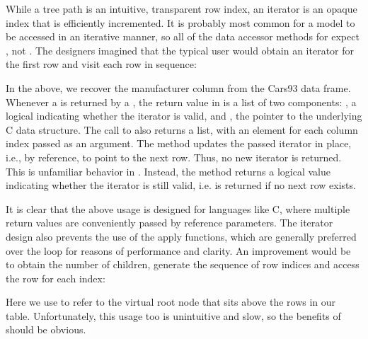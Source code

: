 While a tree path is an intuitive, transparent row index, an iterator
is an opaque index that is efficiently incremented. It is
probably most common for a model to be accessed in an iterative
manner, so all of the data accessor methods for 
expect , not . The \GTK\/
designers imagined that the typical user would obtain an iterator for
the first row and visit each row in sequence:
\begin{Schunk}
\end{Schunk}
%
In the above, we recover the manufacturer column from the Cars93 data
frame. Whenever a  is returned by a
, the return value in \R\/ is a list of two
components: , a logical indicating whether the iterator
is valid, and , the pointer to the underlying C data
structure. The call to  also returns a list,
with an element for each column index passed as an argument. The
method  updates the passed iterator in
place, i.e., by reference, to point to the next row. Thus, no new
iterator is returned. This is unfamiliar behavior in \R. Instead, the
method returns a logical value indicating whether the iterator is
still valid, i.e.  is returned if no next row exists.

It is clear that the above usage is designed for languages like C,
where multiple return values are conveniently passed by reference
parameters. The iterator design also prevents the use of the apply
functions, which are generally preferred over the  loop
for reasons of performance and clarity. An improvement would be to
obtain the number of children, generate the sequence of row indices
and access the row for each index:
\begin{Schunk}
\end{Schunk}
%
Here we use  to refer to the virtual root node that sits
above the rows in our table. Unfortunately, this usage too is
unintuitive and slow, so the benefits of  should
be obvious.

